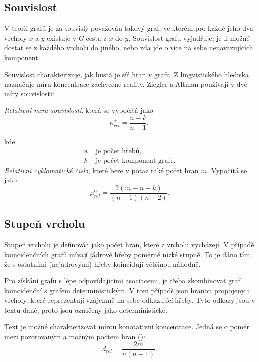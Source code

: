 \documentclass[dp.tex]{subfiles}
\begin{document}
\subsection{Souvislost}
V teorii grafů je za souvislý považován takový graf, ve kterém pro každé jeho dva vrcholy $x$ a $y$ existuje v $G$ cesta z $x$ do $y$. Souvislost grafu vyjadřuje, je-li možné dostat se z každého vrcholu do jiného, nebo zda jde o více na sebe nenavazujících komponent.

Souvislost charakterizuje, jak hustá je síť hran v grafu. Z lingvistického hlediska naznačuje míru koncentrace zachycené reality. Ziegler a Altman používají v \cite{ZieglerAltmann2002} dvě míry souvislosti:

\textit{Relativní míra souvislosti}, která se vypočítá jako
\begin{equation}
\kappa_\textit{rel}^\alpha=\frac{n-k}{n-1},
\end{equation}

kde
\begin{align*}
	n & \text{ je počet hřebů,}\\
	k & \text{ je počet komponent grafu.}
\end{align*}  
\textit{Relativní cyklomatické číslo}, které bere v potaz také počet hran $m$. Vypočítá se jako
\begin{equation}
\mu_\textit{rel}^\alpha=\frac{2(m-n+k)}{(n-1)(n-2)}.
\end{equation}

\subsection{Stupeň vrcholu}
Stupeň vrcholu je definován jako počet hran, které z vrcholu vycházejí. V případě koincidenčních grafů mívají jádrové hřeby poměrně nízké stupně. To je dáno tím, že s ostatními (nejádrovými) hřeby koincidují většinou náhodně.

Pro získání grafu s lépe odpovídajícími asociacemi, je třeba zkombinovat graf koincidenční s grafem deterministickým. V tom případě jsou hranou propojeny i vrcholy, které reprezentují vzájemně na sebe odkazující hřeby. Tyto odkazy jsou v textu dané, proto jsou označeny jako deterministické.

Text je možné charakterizovat mírou konotativní koncentrace. Jedná se o poměr mezi pozorovaným a možným počtem hran (\cite[str. 312]{Wimmer2003}):
\begin{equation}
d_\textit{rel}=\frac{2m}{n(n-1)}.
\end{equation}
\end{document}
